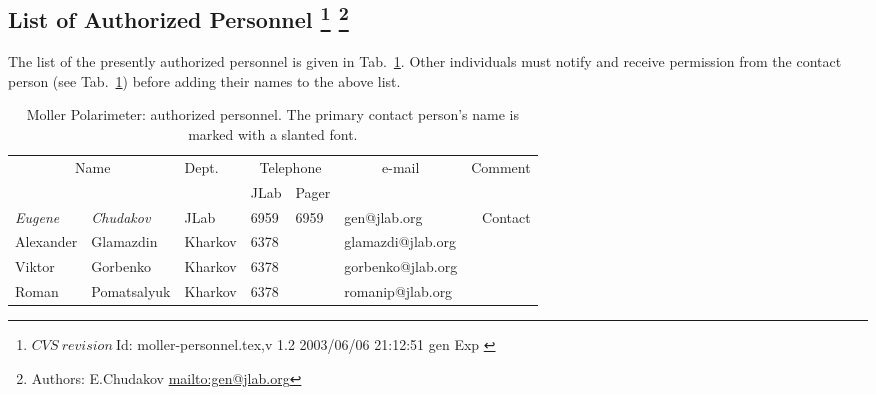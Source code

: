\begin{safetyen}{0}{0}
\subsection[List of Authorized  Personnel]{List of Authorized  Personnel
\footnote{
   $CVS~revision~ $Id: moller-personnel.tex,v 1.2 2003/06/06 21:12:51 gen Exp $ $
 }
\footnote{Authors: E.Chudakov \url{mailto:gen@jlab.org}}
}
\end{safetyen}
The list
of the presently authorized personnel is given in Tab.~\ref{tab:moller:personnel}.
Other individuals must notify and receive permission from
the contact person (see Tab.~\ref{tab:moller:personnel}) before adding their names 
to the above list.
\begin{table}[ht]
\begin{center}
\begin{tabular}{|ll|l|l|l|l|r|} \hline
  \multicolumn{2}{|c|}{Name} & Dept. & \multicolumn{2}{c|}{Telephone} & 
  \multicolumn{1}{c|}{e-mail} & Comment \\ 
  \cline{4-5}
   &  &   & JLab & Pager &  & \\ 
\hline
 {\em Eugene} & {\em Chudakov}  & JLab    & 6959 & 6959 & gen@jlab.org      & Contact     \\ 
 Alexander    & Glamazdin       & Kharkov & 6378 &      & glamazdi@jlab.org &  \\ 
 Viktor       & Gorbenko        & Kharkov & 6378 &      & gorbenko@jlab.org &  \\ 
 Roman        & Pomatsalyuk     & Kharkov & 6378 &      & romanip@jlab.org  &  \\ 
\hline
\end{tabular}
\end{center}
\caption[Moller Polarimeter: authorized personnel]{
   Moller Polarimeter: authorized personnel. The primary contact person's
   name is marked with a slanted font. 
}
\label{tab:moller:personnel}
\end{table}

%
%
%
